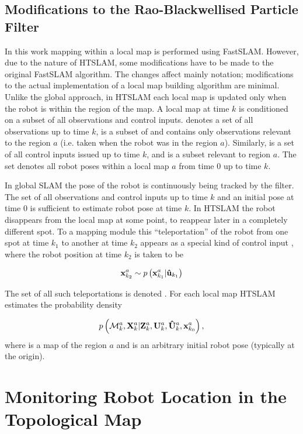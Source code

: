 \subsection{Modifications to the Rao-Blackwellised Particle Filter}


In this work mapping within a local map is performed using
FastSLAM. However, due to the nature of HTSLAM, some modifications have
to be made to the original FastSLAM algorithm. The changes affect
mainly notation; modifications to the actual implementation of a local
map building algorithm are minimal.  Unlike the global approach, in
HTSLAM each local map is updated only when the robot is within the
region of the map. A local map at time $k$ is conditioned on a subset
of all observations and control inputs.  denotes a set of
all observations up to time $k$,  is a subset of 
and contains only observations relevant to the region $a$ (i.e. taken
when the robot was in the region $a$). Similarly,  is a set
of all control inputs issued up to time $k$, and  is a
subset relevant to region $a$. The set  denotes all robot
poses within a local map $a$ from time $0$ up to time $k$.

In global SLAM the pose of the robot is continuously being tracked by
the filter. The set of all observations and control inputs up to time
$k$ and an initial pose at time 0 is sufficient to estimate robot pose
at time $k$. In HTSLAM the robot disappears from the local map at some
point, to reappear later in a completely different spot. To a mapping
module this ``teleportation'' of the robot from one spot at time $k_1$
to another at time $k_2$ appears as a special kind of control input
, where the robot position at time $k_2$ is taken to be 

$$
\x{k_2}{}{a} \sample{}{} \prob{\x{k_1}{}{a} | \Teleport{k_1}}
$$

The set of all such teleportations is denoted . For
each local map HTSLAM estimates the probability density

$$
\prob{\map{k}{}{a},\Xall{k}{}{a} | 
\Zall{k}{a},\Uall{k}{a},\TeleportAll{k}{a},\x{k_0}{}{a}},
$$
where  is a map of the region $a$ and  is an
arbitrary initial robot pose (typically at the origin).




\section{Monitoring Robot Location in the Topological Map}
\label{sec:topological_pose}

